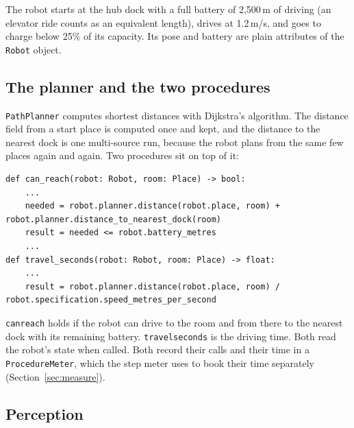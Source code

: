 \documentclass[10pt]{article}
\newcommand{\brkunderscore}{\textunderscore\allowbreak}
\newcommand{\code}[1]{{\let\_\brkunderscore\texttt{#1}}}
\begin{document}
The robot starts at the hub dock with a full battery of 2,500\,m of driving (an elevator ride counts as an equivalent
length), drives at 1.2\,m/s, and goes to charge below 25\% of its capacity. Its pose and battery are plain attributes of
the \code{Robot} object.

\subsection{The planner and the two procedures}

\code{PathPlanner} computes shortest distances with Dijkstra's algorithm. The distance field from a start place is
computed once and kept, and the distance to the nearest dock is one multi-source run, because the robot plans from the
same few places again and again. Two procedures sit on top of it:
\begin{lstlisting}[style=py]
def can_reach(robot: Robot, room: Place) -> bool:
    ...
    needed = robot.planner.distance(robot.place, room) + robot.planner.distance_to_nearest_dock(room)
    result = needed <= robot.battery_metres
    ...
def travel_seconds(robot: Robot, room: Place) -> float:
    ...
    result = robot.planner.distance(robot.place, room) / robot.specification.speed_metres_per_second
\end{lstlisting}
\code{can\_reach} holds if the robot can drive to the room and from there to the nearest dock with its remaining
battery. \code{travel\_seconds} is the driving time. Both read the robot's state when called. Both record their calls
and their time in a \code{ProcedureMeter}, which the step meter uses to book their time separately
(Section~\ref{sec:measure}).

\subsection{Perception}
\end{document}
